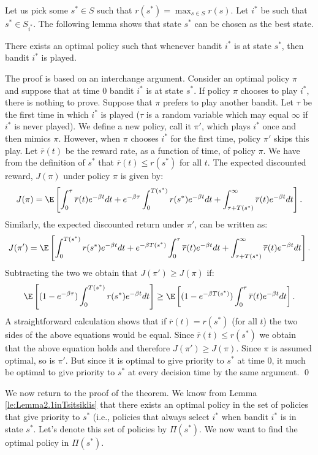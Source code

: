 Let us pick some $s^*\in S$ such that $r(s^*) = \max_{s \in S} r(s)$. Let $i^*$ be such that $s^* \in S_{i^*}$. The following lemma shows that state $s^*$ can be chosen as the best state.
\begin{lemma}\label{le:Lemma2.1inTsitsiklis}
There exists an optimal policy such that whenever bandit $i^*$ is at state $s^*$, then bandit $i^*$ is played.
\end{lemma}
\proof
The proof is based on an interchange argument. Consider an optimal policy $\pi$ and suppose that at time 0 bandit $i^*$ is at state $s^*$. If policy $\pi$ chooses to play $i^*$, there is nothing to prove. Suppose that $\pi$ prefers to play another bandit. Let $\tau$ be the first time in which $i^*$ is played ($\tau$ is a random variable which may equal $\infty$ if $i^*$ is never played).
We define a new policy, call it $\pi'$, which plays $i^*$ once and then mimics $\pi$. However, when $\pi$ chooses $i^*$ for the first time, policy $\pi'$ skips this play. Let $\overline{r}(t)$ be the reward rate, as a function of time, of policy $\pi$. We have from the definition of $s^*$ that $\overline{r}(t) \le r(s^*)$ for all $t$.
The expected discounted reward, $J(\pi)$ under policy $\pi$ is given by:
$$
J(\pi) = \E \left[ \int_0^\tau \overline{r}(t) e^{-\beta t}  d  t +
e^{-\beta \tau}\int_0^{T(s^*)} r(s^*) e^{-\beta t}  d  t +
\int_{\tau+T(s^*)}^\infty \overline{r}(t) e^{-\beta t}  d  t \right].
$$
Similarly, the expected discounted return under $\pi'$, can be written as:
$$
J(\pi') = \E \left[
\int_0^{T(s^*)} r(s^*) e^{-\beta t}  d  t +
e^{-\beta T(s^*)} \int_0^\tau \overline{r}(t) e^{-\beta t}  d  t +
\int_{\tau+T(s^*)}^\infty \overline{r}(t) e^{-\beta t}  d  t \right].
$$
Subtracting the two we obtain that $J(\pi') \ge J(\pi)$ if:
$$
\E \left[(1- e^{-\beta \tau}) \int_0^{T(s^*)} r(s^*) e^{-\beta t}  d  t \right]\ge
\E \left[(1- e^{-\beta T(s^*)}) \int_0^\tau \overline{r}(t) e^{-\beta t}  d  t \right].
$$
A straightforward calculation shows that if $\overline{r}(t) = r(s^*)$ (for all $t$) the two sides of the above equations would be equal. Since $\overline{r}(t) \le  r(s^*)$ we obtain that the above equation holds and therefore $J(\pi') \ge J(\pi)$.
Since $\pi$ is assumed optimal, so is $\pi'$. But since it is optimal to give priority to $s^*$ at time 0, it much be optimal to give priority to $s^*$ at every decision time by the same argument.
\qed

We now return to the proof of the theorem. We know from Lemma \ref{le:Lemma2.1inTsitsiklis} that there exists an optimal policy in the set of policies that give priority to $s^*$ (i.e., policies that always select $i^*$ when bandit $i^*$ is in state $s^*$. Let's denote this set of policies by $\Pi(s^*)$. We now want to find the optimal policy in $\Pi(s^*)$.

